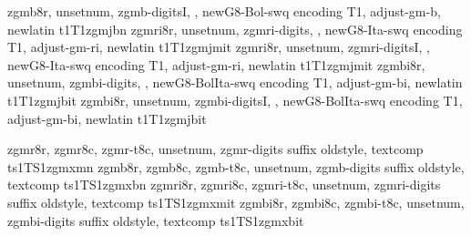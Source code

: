 {zgmb8r,%
unsetnum,%
zgmb-digitsI,%
\metrics {},%
newG8-Bol-swq encoding T1,%
adjust-gm-b,%
newlatin}
{t1}{T1}{zgmj}{b}{n}{}
%
{zgmri8r,%
unsetnum,%
zgmri-digits,%
\metrics {},%
newG8-Ita-swq encoding T1,%
adjust-gm-ri,%
newlatin}
{t1}{T1}{zgmj}{m}{it}{}
%
{zgmri8r,%
unsetnum,%
zgmri-digitsI,%
\metrics {},%
newG8-Ita-swq encoding T1,%
adjust-gm-ri,%
newlatin}
{t1}{T1}{zgmj}{m}{it}{}
%
{zgmbi8r,%
unsetnum,%
zgmbi-digits,%
\metrics {},%
newG8-BolIta-swq encoding T1,%
adjust-gm-bi,%
newlatin}
{t1}{T1}{zgmj}{b}{it}{}
%
{zgmbi8r,%
unsetnum,%
zgmbi-digitsI,%
\metrics {},%
newG8-BolIta-swq encoding T1,%
adjust-gm-bi,%
newlatin}
{t1}{T1}{zgmj}{b}{it}{}

%
{zgmr8r,%
zgmr8c,%
zgmr-t8c,%
unsetnum,%
zgmr-digits suffix oldstyle,%
textcomp}
{ts1}{TS1}{zgmx}{m}{n}{}
%
{zgmb8r,%
zgmb8c,%
zgmb-t8c,%
unsetnum,%
zgmb-digits suffix oldstyle,%
textcomp}
{ts1}{TS1}{zgmx}{b}{n}{}
%
{zgmri8r,%
zgmri8c,%
zgmri-t8c,%
unsetnum,%
zgmri-digits suffix oldstyle,%
textcomp}
{ts1}{TS1}{zgmx}{m}{it}{}
%
{zgmbi8r,%
zgmbi8c,%
zgmbi-t8c,%
unsetnum,%
zgmbi-digits suffix oldstyle,%
textcomp}
{ts1}{TS1}{zgmx}{b}{it}{}


\endinstallfonts
\bye
